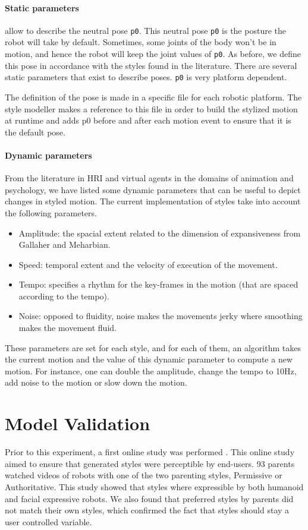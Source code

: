 \documentclass[a4paper,twocolumn]{svjour3}
\begin{document}
\paragraph{Static parameters} allow to describe the neutral pose \texttt{p0}. 
This neutral pose \texttt{p0} is the posture the robot will take by default.
Sometimes, some joints of the body won't be in motion,  and hence the robot will keep the joint values of \texttt{p0}.
As before, we define this pose in accordance with the styles found in the literature. 
There are several static parameters that exist to describe poses. 
\texttt{p0} is very platform dependent. 

The definition of the pose is made in a specific file for each robotic platform. 
The style modeller makes a reference to this file in order to build the stylized motion at runtime and adds p0 before and after each motion event to ensure that it is the default pose.




\paragraph{Dynamic parameters}
From the literature in HRI and virtual agents in the domains of animation and psychology, we have listed some dynamic parameters that can be useful to depict changes in styled motion.
The current implementation of styles take into account the following parameters. 
\begin{itemize}[noitemsep,nolistsep]
	\item Amplitude: the spacial extent related to the dimension of expansiveness from Gallaher and Meharbian.
	\item Speed: temporal extent and the velocity of execution of the movement.
	\item Tempo: specifies a rhythm for the key-frames in the motion (that are spaced according to the tempo).
	\item Noise: opposed to fluidity, noise makes the movements jerky where smoothing makes the movement fluid.
\end{itemize}
These parameters are set for each style, and for each of them, an algorithm takes the current motion and the value of this dynamic parameter to compute a new motion.
For instance, one can double the amplitude, change the tempo to 10Hz, add noise to the motion or slow down the motion.

\section{Model Validation}
Prior to this experiment, a first online study was performed \cite{Johal2014}. 
This online study aimed to ensure that generated styles were perceptible by end-users. 
93 parents watched videos of robots with one of the two parenting styles, Permissive or Authoritative. 
This study showed that styles where expressible by both humanoid and facial expressive robots. 
We also found that preferred styles by parents did not match their own styles, which confirmed the fact that styles should stay a user controlled variable. 
\end{document}
